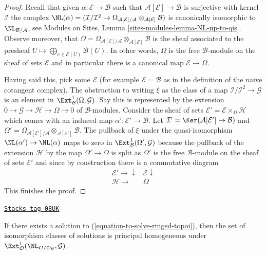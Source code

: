\begin{proof}
Recall that given $\alpha : \mathcal{E} \to \mathcal{B}$
such that $\mathcal{A}[\mathcal{E}] \to \mathcal{B}$ is surjective
with kernel $\mathcal{I}$ the complex
$\NL(\alpha) = (\mathcal{I}/\mathcal{I}^2 \to
\Omega_{\mathcal{A}[\mathcal{E}]/\mathcal{A}}
\otimes_{\mathcal{A}[\mathcal{E}]} \mathcal{B})$ is canonically
isomorphic to $\NL_{\mathcal{B}/\mathcal{A}}$, see
Modules on Sites, Lemma \ref{sites-modules-lemma-NL-up-to-qis}.
Observe moreover, that
$\Omega = \Omega_{\mathcal{A}[\mathcal{E}]/\mathcal{A}}
\otimes_{\mathcal{A}[\mathcal{E}]} \mathcal{B}$ is the sheaf
associated to the presheaf
$U \mapsto \bigoplus_{e \in \mathcal{E}(U)} \mathcal{B}(U)$.
In other words, $\Omega$ is the free $\mathcal{B}$-module on the
sheaf of sets $\mathcal{E}$ and in particular there is a canonical
map $\mathcal{E} \to \Omega$.

\medskip\noindent
Having said this, pick some $\mathcal{E}$ (for example
$\mathcal{E} = \mathcal{B}$ as in the definition of the naive cotangent
complex). The obstruction to writing $\xi$ as the class of a map
$\mathcal{I}/\mathcal{I}^2 \to \mathcal{G}$ is an element in
$\Ext^1_\mathcal{B}(\Omega, \mathcal{G})$. Say this is represented
by the extension $0 \to \mathcal{G} \to \mathcal{H} \to \Omega \to 0$
of $\mathcal{B}$-modules. Consider the sheaf of sets
$\mathcal{E}' = \mathcal{E} \times_\Omega \mathcal{H}$
which comes with an induced map $\alpha' : \mathcal{E}' \to \mathcal{B}$.
Let $\mathcal{I}' = \Ker(\mathcal{A}[\mathcal{E}'] \to \mathcal{B})$
and $\Omega' = \Omega_{\mathcal{A}[\mathcal{E}']/\mathcal{A}}
\otimes_{\mathcal{A}[\mathcal{E}']} \mathcal{B}$.
The pullback of $\xi$ under the quasi-isomorphism
$\NL(\alpha') \to \NL(\alpha)$ maps to zero in
$\Ext^1_\mathcal{B}(\Omega', \mathcal{G})$
because the pullback of the extension $\mathcal{H}$
by the map $\Omega' \to \Omega$ is split as $\Omega'$ is the free
$\mathcal{B}$-module on the sheaf of sets $\mathcal{E}'$ and since
by construction there is a commutative diagram
$$
\begin{array}{cc}\mathcal{E}' \longrightarrow\downarrow & \mathcal{E} \downarrow \\ \mathcal{H} \longrightarrow & \Omega\end{array}
$$
This finishes the proof.
\end{proof}

\begin{lemma}
\label{defos-lemma-choices-ringed-topoi}
\href{https://stacks.math.columbia.edu/tag/08UK}{\texttt{Stacks tag 08UK}}

If there exists a solution to (\ref{equation-to-solve-ringed-topoi}),
then the set of isomorphism classes of solutions is principal homogeneous
under $\Ext^1_\mathcal{O}(
\NL_{\mathcal{O}/\mathcal{O}_\mathcal{B}}, \mathcal{G})$.
\end{lemma}

